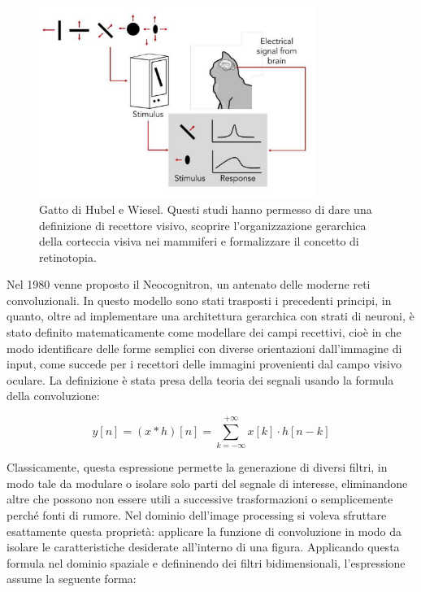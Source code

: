 \begin{figure}[htbp]
    \centering
    \includegraphics[width=0.8\textwidth]{figures/Hubel_and_Wiesel_cat.png}
    \caption{Gatto di Hubel e Wiesel. Questi studi hanno permesso di dare una definizione di recettore visivo, scoprire l'organizzazione gerarchica della corteccia visiva nei mammiferi e formalizzare il concetto di retinotopia.}
    \label{fig:chatto}
\end{figure}


\noindent Nel 1980 venne proposto il Neocognitron, un antenato delle moderne reti convoluzionali. In questo modello sono stati trasposti i precedenti principi, in quanto, oltre ad implementare una architettura gerarchica con strati di neuroni, è stato definito matematicamente come modellare dei campi recettivi, cioè in che modo identificare delle forme semplici con diverse orientazioni dall'immagine di input, come succede per i recettori delle immagini provenienti dal campo visivo oculare. La definizione è stata presa della teoria dei segnali usando la formula della convoluzione: 

\begin{equation} \label{eq:convolution}
y[n] = (x * h)[n] = \sum_{k=-\infty}^{+\infty} x[k] \cdot h[n - k]
\end{equation}

\noindent Classicamente, questa espressione permette la generazione di diversi filtri, in modo tale da modulare o isolare solo parti del segnale di interesse, eliminandone altre che possono non essere utili a successive trasformazioni o semplicemente perché fonti di rumore. Nel dominio dell'image processing si voleva sfruttare esattamente questa proprietà: applicare la funzione di convoluzione in modo da isolare le caratteristiche desiderate all'interno di una figura. Applicando questa formula nel dominio spaziale e defininendo dei filtri bidimensionali, l'espressione assume la seguente forma: 

